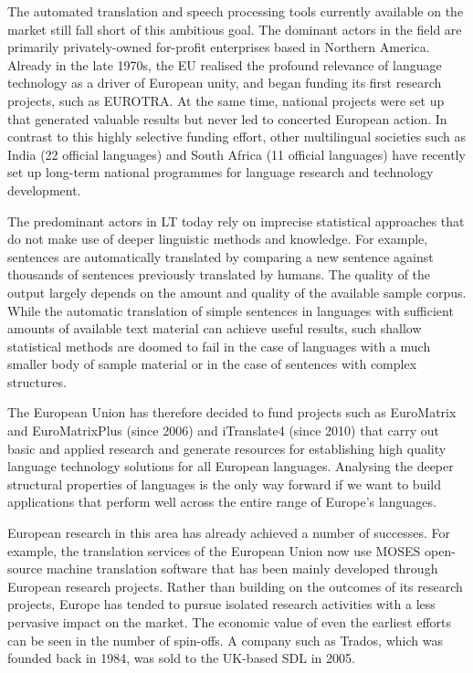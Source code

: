 \documentclass[]{../../metanetpaper}
\begin{document}
\begin{multicols}{2}

The automated translation and speech processing tools currently available on
the market still fall short of this ambitious goal. The dominant actors in the
field are primarily privately-owned for-profit enterprises based in Northern
America. Already in the late 1970s, the EU realised the profound relevance of
language technology as a driver of European unity, and began funding its first
research projects, such as EUROTRA. At the same time, national projects were
set up that generated valuable results but never led to concerted European
action. In contrast to this highly selective funding effort, other multilingual
societies such as India (22 official languages) and South Africa (11 official
languages) have recently set up long-term national programmes for language
research and technology development.

The predominant actors in LT today rely on imprecise statistical approaches
that do not make use of deeper linguistic methods and knowledge. For example,
sentences are automatically translated by comparing a new sentence against
thousands of sentences previously translated by humans. The quality of the
output largely depends on the amount and quality of the available sample
corpus. While the automatic translation of simple sentences in languages with
sufficient amounts of available text material can achieve
useful results, such shallow statistical methods
are doomed to fail in the case of languages with a much smaller body of sample
material or in the case of sentences with complex
structures.

The European Union has therefore decided to fund projects such as EuroMatrix
and EuroMatrixPlus (since 2006) and iTranslate4 (since 2010) that carry out
basic and applied research and generate resources for establishing high quality
language technology solutions for all European languages. Analysing the deeper
structural properties of languages is the only way forward if we want to build
applications that perform well across the entire range of Europe’s languages.

European research in this area has already achieved a number of successes. For
example, the translation services of the European Union now use MOSES
open-source machine translation software that has been mainly developed through
European research projects. Rather than building on the outcomes of its
research projects, Europe has tended to pursue isolated research activities
with a less pervasive impact on the market. The economic value of even the
earliest efforts can be seen in the number of spin-offs. A company such as
Trados, which was founded back in 1984, was sold to the UK-based SDL in 2005.


\end{multicols}
\end{document}
